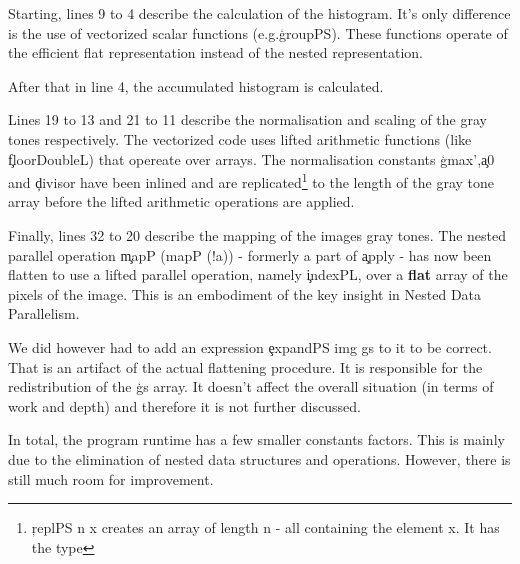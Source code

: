     Starting, lines 9 to 4 describe the calculation of the histogram.
    It's only difference is the use of vectorized scalar functions (e.g.\c{groupPS}). These functions operate of the efficient flat
    representation instead of the nested representation.
    
    After that in line 4, the accumulated histogram is calculated.
    
    Lines 19 to 13 and 21 to 11 describe the normalisation and scaling of the gray tones respectively.
    The vectorized code uses lifted arithmetic functions (like \c{floorDoubleL}) that
    opereate over arrays.
    The normalisation constants \c{gmax'},\c{a0} and \c{divisor}
    have been inlined and are replicated\footnote{\c{replPS n x} creates an array of length n - all containing the element x. It has the type }
    to the length of the gray tone array before the lifted arithmetic operations are applied.
    
    
    Finally, lines 32 to 20 describe the mapping of the images gray tones.
    The nested parallel operation \c{mapP (mapP (!a))} - formerly a part of \c{apply} - 
    has now been flatten to use a lifted parallel operation, namely \c{indexPL}, over a \textbf{flat} array of
    the pixels of the image. This is an embodiment of the key insight in Nested Data Parallelism.
    
    We did however had to add an expression \c{expandPS img gs} to it to be
    correct. That is an artifact of the actual flattening procedure.
    It is responsible for the redistribution of the \c{gs} array. It doesn't affect the
    overall situation (in terms of work and depth) and therefore
    it is not further discussed.
    
    In total, the program runtime has a few smaller constants factors. This is mainly due to the elimination of nested data structures
    and operations. However, there is still much room for improvement.

